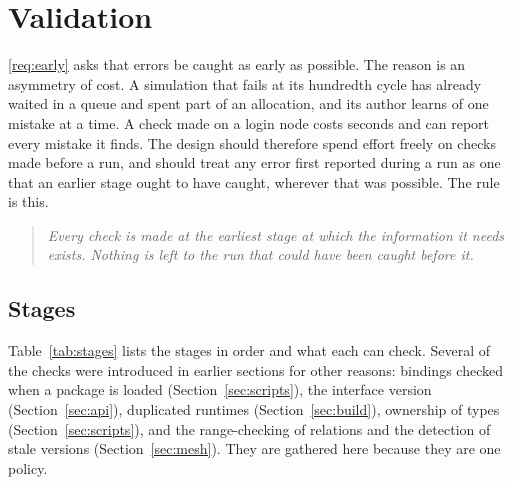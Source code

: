 \documentclass[11pt,a4paper]{article}
\begin{document}
\section{Validation}
\label{sec:validation}

\ref{req:early} asks that errors be caught as early as possible.  The
reason is an asymmetry of cost.  A simulation that fails at its hundredth
cycle has already waited in a queue and spent part of an allocation, and
its author learns of one mistake at a time.  A check made on a login node
costs seconds and can report every mistake it finds.  The design should
therefore spend effort freely on checks made before a run, and should treat
any error first reported during a run as one that an earlier stage ought to
have caught, wherever that was possible.  The rule is this.

\begin{quote}
\emph{Every check is made at the earliest stage at which the information it
needs exists.  Nothing is left to the run that could have been caught
before it.}
\end{quote}

\subsection{Stages}

Table~\ref{tab:stages} lists the stages in order and what each can check.
Several of the checks were introduced in earlier sections for other
reasons: bindings checked when a package is loaded
(Section~\ref{sec:scripts}), the interface version
(Section~\ref{sec:api}), duplicated runtimes (Section~\ref{sec:build}),
ownership of types (Section~\ref{sec:scripts}), and the range-checking of
relations and the detection of stale versions (Section~\ref{sec:mesh}).
They are gathered here because they are one policy.
\end{document}
